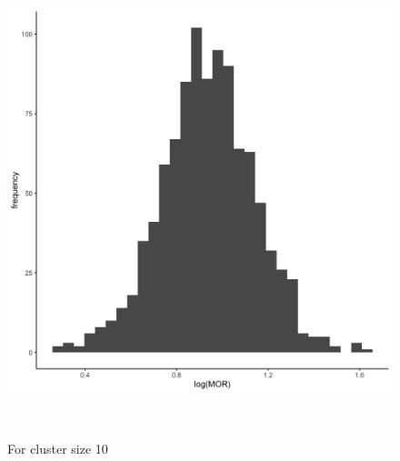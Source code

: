 \documentclass[
  letterpaper,
  DIV=11,
  numbers=noendperiod,
  titlepage]{scrartcl}
\begin{document}
\begin{figure}
\begin{minipage}[t]{0.50\linewidth}
{{\includegraphics{../../plots/two-lvl-ran-slope/high-prev/hist_100_10_two_lvl_slp_high_prev.png}

}

\caption{For cluster size 10}

}

\end{minipage}%
\newline
\begin{minipage}[t]{\linewidth}

{\centering 

~

}

\end{minipage}%
\newline
\begin{minipage}[t]{0.50\linewidth}

{\centering 

\raisebox{-\height}{

}}
\end{minipage}
\end{figure}
\end{document}
